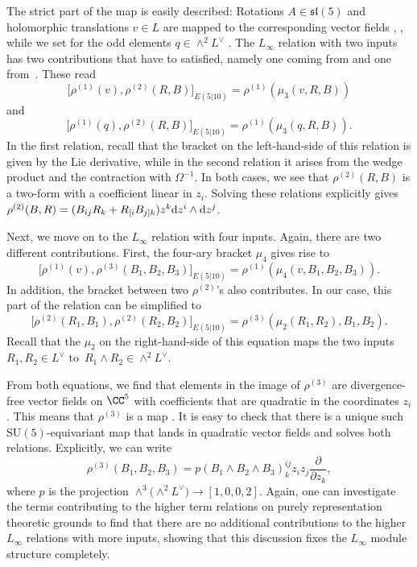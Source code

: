 \documentclass[pdftex]{sigma}
\numberwithin{equation}{section}
\theoremstyle{definition}
\DeclareMathOperator{\Vect}{Vect}
\def\d{{\rm d}}
\def\SU{\ensuremath{\mathrm{SU}}}
\begin{document}
The strict part of the map is easily described: Rotations $A \in \mathfrak{sl}(5)$ and holomorphic translations $v \in L$ are mapped to the corresponding vector fields
, ,
while we set for the odd elements $q \in \wedge^2 L^\vee$
\smash{$
 \rho^{(1)}(q) = q_{ij} \d z^i \wedge \d z^j$}.
The $L_\infty$ relation with two inputs has two contributions that have to satisfied, namely one coming from  and one from~. These read
\[
 \big[\rho^{(1)}(v) , \rho^{(2)} (R,B)\big]_{E(5|10)} = \rho^{(1)}(\mu_3(v,R,B))
\]
and
\[
 \big[\rho^{(1)}(q) , \rho^{(2)}(R,B)\big]_{E(5|10)} = \rho^{(1)}(\mu_3(q,R,B)).
\]
In the first relation, recall that the bracket on the left-hand-side of this relation is given by the Lie derivative, while in the second relation it arises from the wedge product and the contraction with $\Omega^{-1}$. In both cases, we see that $\rho^{(2)}(R,B)$ is a two-form with a coefficient linear in $z_i$. Solving these relations explicitly gives
$
 \rho^{(2)}(B,R) = (B_{ij} R_k + R_{[i} B_{j]k} ) z^k \d z^i \wedge \d z^j$.

Next, we move on to the $L_\infty$ relation with four inputs. Again, there are two different contributions. First, the four-ary bracket $\mu_4$ gives rise to
\[
 \big[\rho^{(1)}(v), \rho^{(3)}(B_1,B_2,B_3)\big]_{E(5|10)} = \rho^{(1)}(\mu_4(v,B_1,B_2,B_3)).
\]
In addition, the bracket between two $\rho^{(2)}$'s also contributes. In our case, this part of the relation can be simplified to
\[
 \big[\rho^{(2)}(R_1, B_1) , \rho^{(2)}(R_2,B_2)\big]_{E(5|10)} = \rho^{(3)}(\mu_2(R_1,R_2), B_1,B_2).
\]
Recall that the $\mu_2$ on the right-hand-side of this equation maps the two inputs $R_1, R_2 \in L^\vee$ to~${R_1 \wedge R_2 \in \wedge^2 L^\vee}$.

From both equations, we find that elements in the image of $\rho^{(3)}$ are divergence-free vector fields on $\CC^5$ with coefficients that are quadratic in the coordinates $z_i$. This means that $\rho^{(3)}$ is a map
\smash{$
 \rho^{(3)}\colon \wedge^3\big(\wedge^2 L^\vee\big) \longrightarrow \Vect_0\big(\CC^5\big)$}.
It is easy to check that there is a unique such $\SU(5)$-equivariant map that lands in quadratic vector fields and solves both relations. Explicitly, we can write
\[
 \rho^{(3)}(B_1,B_2,B_3) = p(B_1 \wedge B_2 \wedge B_3)^{ij}_k z_i z_j \frac{\partial}{\partial z_k},
\]
where $p$ is the projection $\wedge^3\bigl(\wedge^2 L^\vee\bigr) \rightarrow [1,0,0,2]$.
Again, one can investigate the terms contributing to the higher term relations on purely representation theoretic grounds to find that there are no additional contributions to the higher $L_\infty$ relations with more inputs, showing that this discussion fixes the $L_\infty$ module structure completely.
\end{document}
